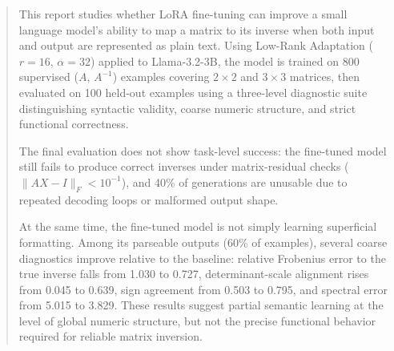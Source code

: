 \begin{abstract}
This report studies whether LoRA fine-tuning can improve a small language model's ability to map a matrix to its inverse when both input and output are represented as plain text. Using Low-Rank Adaptation ($r = 16$, $\alpha = 32$) applied to Llama-3.2-3B, the model is trained on 800 supervised ($A$, $A^{-1}$) examples covering $2 \times 2$ and $3 \times 3$ matrices, then evaluated on 100 held-out examples using a three-level diagnostic suite distinguishing syntactic validity, coarse numeric structure, and strict functional correctness.

The final evaluation does not show task-level success: the fine-tuned model still fails to produce correct inverses under matrix-residual checks ($\|AX - I\|_F < 10^{-1}$), and 40\% of generations are unusable due to repeated decoding loops or malformed output shape.

At the same time, the fine-tuned model is not simply learning superficial formatting. Among its parseable outputs (60\% of examples), several coarse diagnostics improve relative to the baseline: relative Frobenius error to the true inverse falls from 1.030 to 0.727, determinant-scale alignment rises from 0.045 to 0.639, sign agreement from 0.503 to 0.795, and spectral error from 5.015 to 3.829. These results suggest partial semantic learning at the level of global numeric structure, but not the precise functional behavior required for reliable matrix inversion.
\end{abstract}
